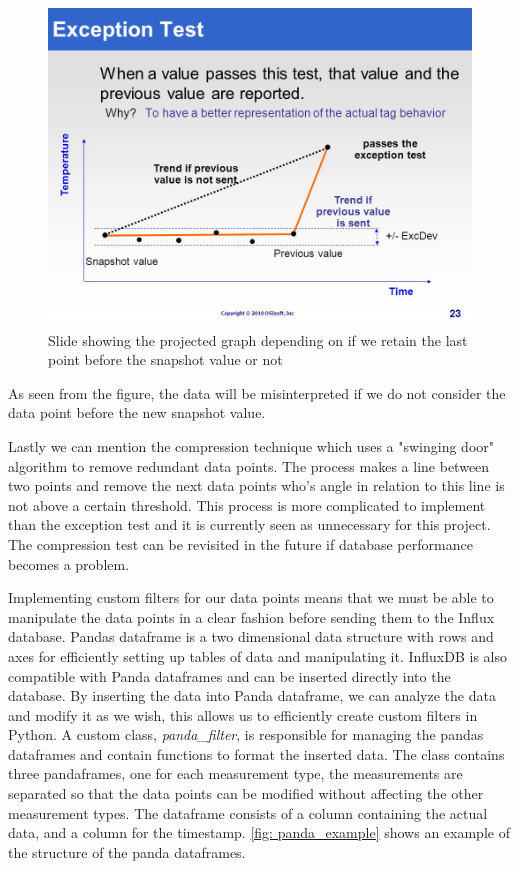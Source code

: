 \documentclass[main.tex]{subfiles}
\begin{document}
\begin{figure}[!htpb]
    \centering
    \includegraphics[width=12cm, scale=4]{images/osisoft_last_point.jpg}
    \caption{Slide showing the projected graph depending on if we retain the last point before the snapshot value or not\cite{osisoft_exception}}
    \label{fig: osisoft_last_point}
\end{figure}
\FloatBarrier 
 
 As seen from the figure, the data will be misinterpreted if we do not consider the data point before the new snapshot value. 
 
 Lastly we can mention the compression technique which uses a "swinging door" algorithm to remove redundant data points. The process makes a line between two points and remove the next data points who's angle in relation to this line is not above a certain threshold. This process is more complicated to implement than the exception test and it is currently seen as unnecessary for this project. The compression test can be revisited in the future if database performance becomes a problem.
 
 Implementing custom filters for our data points means that we must be able to manipulate the data points in a clear fashion before sending them to the Influx database. Pandas dataframe is a two dimensional data structure with rows and axes for efficiently setting up tables of data and manipulating it. InfluxDB is also compatible with Panda dataframes and can be inserted directly into the database. By inserting the data into Panda dataframe, we can analyze the data and modify it as we wish, this allows us to efficiently create custom filters in Python. A custom class, \textit{panda\_filter}, is responsible for managing the pandas dataframes and contain functions to format the inserted data. The class contains three pandaframes, one for each measurement type, the measurements are separated so that the data points can be modified without affecting the other measurement types. The dataframe consists of a column containing the actual data, and a column for the timestamp. \autoref{fig: panda_example} shows an example of the structure of the panda dataframes. 
 
\end{document}
